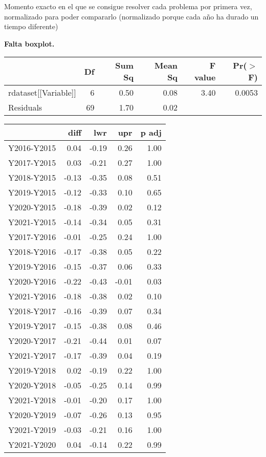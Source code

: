 Momento exacto en el que se consigue resolver cada problema por primera vez, normalizado para poder compararlo (normalizado porque cada año ha durado  un tiempo diferente)

\textbf{Falta boxplot.}

\begin{table}[H]
\centering
\begin{tabular}{lrrrrr}
  \hline
 & Df & Sum Sq & Mean Sq & F value & Pr($>$F) \\ 
  \hline
rdataset[[Variable]] & 6 & 0.50 & 0.08 & 3.40 & 0.0053 \\ 
  Residuals            & 69 & 1.70 & 0.02 &  &  \\ 
   \hline
\end{tabular}
\end{table}

\begin{table}[H]
\centering
\begin{tabular}{rrrrr}
  \hline
 & diff & lwr & upr & p adj \\ 
  \hline
Y2016-Y2015 & 0.04 & -0.19 & 0.26 & 1.00 \\ 
  Y2017-Y2015 & 0.03 & -0.21 & 0.27 & 1.00 \\ 
  Y2018-Y2015 & -0.13 & -0.35 & 0.08 & 0.51 \\ 
  Y2019-Y2015 & -0.12 & -0.33 & 0.10 & 0.65 \\ 
  Y2020-Y2015 & -0.18 & -0.39 & 0.02 & 0.12 \\ 
  Y2021-Y2015 & -0.14 & -0.34 & 0.05 & 0.31 \\ 
  Y2017-Y2016 & -0.01 & -0.25 & 0.24 & 1.00 \\ 
  Y2018-Y2016 & -0.17 & -0.38 & 0.05 & 0.22 \\ 
  Y2019-Y2016 & -0.15 & -0.37 & 0.06 & 0.33 \\ 
  Y2020-Y2016 & -0.22 & -0.43 & -0.01 & 0.03 \\ 
  Y2021-Y2016 & -0.18 & -0.38 & 0.02 & 0.10 \\ 
  Y2018-Y2017 & -0.16 & -0.39 & 0.07 & 0.34 \\ 
  Y2019-Y2017 & -0.15 & -0.38 & 0.08 & 0.46 \\ 
  Y2020-Y2017 & -0.21 & -0.44 & 0.01 & 0.07 \\ 
  Y2021-Y2017 & -0.17 & -0.39 & 0.04 & 0.19 \\ 
  Y2019-Y2018 & 0.02 & -0.19 & 0.22 & 1.00 \\ 
  Y2020-Y2018 & -0.05 & -0.25 & 0.14 & 0.99 \\ 
  Y2021-Y2018 & -0.01 & -0.20 & 0.17 & 1.00 \\ 
  Y2020-Y2019 & -0.07 & -0.26 & 0.13 & 0.95 \\ 
  Y2021-Y2019 & -0.03 & -0.21 & 0.16 & 1.00 \\ 
  Y2021-Y2020 & 0.04 & -0.14 & 0.22 & 0.99 \\ 
   \hline
\end{tabular}
\end{table}

